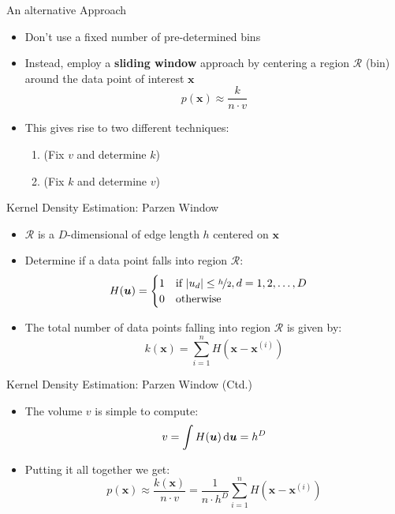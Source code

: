 \begin{frame}{An alternative Approach}{}
	\begin{itemize}
		\item Don't use a fixed number of pre-determined bins
		\item Instead, employ a \textbf{sliding window} approach by centering a region $\mathcal{R}$ (bin)
			around the data point of interest $\bm{x}$
		\begin{equation}
			p(\bm{x}) \approx \frac{k}{n \cdot v}
		\end{equation}
		\item This gives rise to two different techniques:
		\begin{enumerate}
			\item {} (Fix $v$ and determine $k$)
			\item {} (Fix $k$ and determine $v$)
		\end{enumerate}
	\end{itemize}
\end{frame}


\begin{frame}{Kernel Density Estimation: Parzen Window}{}
	\begin{itemize}
		\item $\mathcal{R}$ is a $D$-dimensional  of edge length $h$ centered on $\bm{x}$
		\item Determine if a data point falls into region $\mathcal{R}$:
		\begin{equation}
			H(\bm{u}) = \begin{cases} 
				1\quad \text{if}\ \vert u_d \vert \le \nicefrac{h}{2}, d = 1, 2, \dots, D \\
				0\quad \text{otherwise}
			\end{cases}
		\end{equation}
		\item The total number of data points falling into region $\mathcal{R}$ is given by:
		\begin{equation}
			k(\bm{x}) = \sum_{i=1}^n H(\bm{x} - \bm{x}^{(i)})
		\end{equation}
	\end{itemize}
\end{frame}


\begin{frame}{Kernel Density Estimation: Parzen Window (Ctd.)}{}
	\begin{itemize}
		\item The volume $v$ is simple to compute:
		\begin{equation}
			v = \int H(\bm{u}) \mathop{}\!\mathrm{d} \bm{u} = h^D
		\end{equation}
		\item Putting it all together we get:
		\begin{equation}
			p(\bm{x}) \approx \frac{k(\bm{x})}{n \cdot v} = \frac{1}{n \cdot h^D} \sum_{i=1}^n H(\bm{x} - \bm{x}^{(i)})
		\end{equation}
	\end{itemize}
\end{frame}


